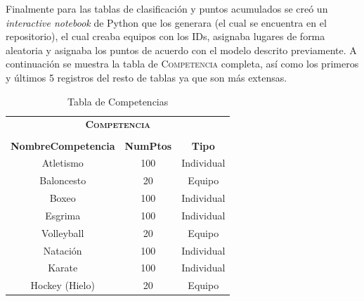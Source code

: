 \documentclass[a4paper, twoside, 12pt]{article}
\begin{document}
Finalmente para las tablas de clasificación y puntos acumulados se creó un \textit{interactive notebook} de Python que los generara (el cual se encuentra en el repositorio), el cual creaba equipos con los IDs, asignaba lugares de forma aleatoria y asignaba los puntos de acuerdo con el modelo descrito previamente. A continuación se muestra la tabla de \textsc{Competencia} completa, así como los primeros y últimos 5 registros del resto de tablas ya que son más extensas.

\begin{table}[H]
    \centering
    \begin{tabular}{|ccc|}
        \multicolumn{3}{c}{\bfseries{\scshape{Competencia}}}\\
        \multicolumn{3}{c}{}\\\hline
        \textbf{NombreCompetencia} &  \textbf{NumPtos} & \textbf{Tipo} \\\hline
        Atletismo & 100 & Individual\\
        Baloncesto & 20 & Equipo\\
        Boxeo & 100 & Individual\\
        Esgrima & 100 & Individual\\
        Volleyball & 20 & Equipo\\
        Natación & 100 & Individual\\
        Karate & 100 & Individual\\
        Hockey (Hielo) & 20 & Equipo\\\hline
    \end{tabular}
    \caption{Tabla de Competencias}
    \label{tab:Comp}
\end{table}
\end{document}
